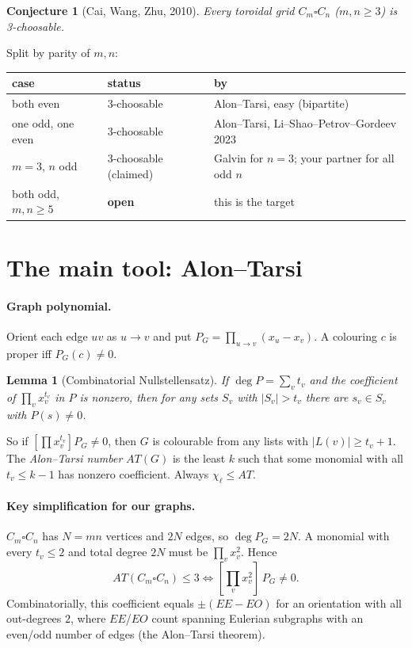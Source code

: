 \documentclass[11pt]{article}
\theoremstyle{plain}
\newtheorem{lemma}[theorem]{Lemma}
\newtheorem{conjecture}[theorem]{Conjecture}
\theoremstyle{definition}
\newcommand{\T}{\square}
\begin{document}
\begin{conjecture}[Cai, Wang, Zhu, 2010]
Every toroidal grid $C_m\T C_n$ ($m,n\ge3$) is 3-choosable.
\end{conjecture}

Split by parity of $m,n$:
\begin{center}
\begin{tabular}{@{}lll@{}}
\toprule
case & status & by \\
\midrule
both even & 3-choosable & Alon--Tarsi, easy (bipartite)\\
one odd, one even & 3-choosable & Alon--Tarsi, Li--Shao--Petrov--Gordeev 2023\\
$m=3$, $n$ odd & 3-choosable (claimed) & Galvin for $n=3$; your partner for all odd $n$\\
both odd, $m,n\ge5$ & \textbf{open} & this is the target\\
\bottomrule
\end{tabular}
\end{center}

\section{The main tool: Alon--Tarsi}

\paragraph{Graph polynomial.} Orient each edge $uv$ as $u\to v$ and put
$P_G=\prod_{u\to v}(x_u-x_v)$. A colouring $c$ is proper iff $P_G(c)\ne0$.

\begin{lemma}[Combinatorial Nullstellensatz]
If $\deg P=\sum_v t_v$ and the coefficient of $\prod_v x_v^{t_v}$ in $P$ is nonzero, then for
any sets $S_v$ with $|S_v|>t_v$ there are $s_v\in S_v$ with $P(s)\ne0$.
\end{lemma}

So if $[\prod x_v^{t_v}]P_G\ne0$, then $G$ is colourable from any lists with
$|L(v)|\ge t_v+1$. The \emph{Alon--Tarsi number} $AT(G)$ is the least $k$ such that some
monomial with all $t_v\le k-1$ has nonzero coefficient. Always $\chi_\ell\le AT$.

\paragraph{Key simplification for our graphs.} $C_m\T C_n$ has $N=mn$ vertices and $2N$
edges, so $\deg P_G=2N$. A monomial with every $t_v\le2$ and total degree $2N$ must be
$\prod_v x_v^2$. Hence
\[
AT(C_m\T C_n)\le 3 \iff [\textstyle\prod_v x_v^2]\,P_G\ne0 .
\]
Combinatorially, this coefficient equals $\pm(EE-EO)$ for an orientation with all
out-degrees $2$, where $EE$/$EO$ count spanning Eulerian subgraphs with an even/odd number
of edges (the Alon--Tarsi theorem).
\end{document}
